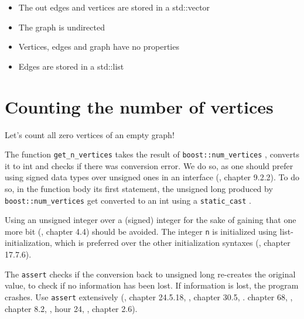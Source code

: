 \begin{itemize}
  \item The out edges and vertices are stored in a std::vector
  \item The graph is undirected
  \item Vertices, edges and graph have no properties
  \item Edges are stored in a std::list
\end{itemize}

\section{Counting the number of vertices}
\label{subsec:get_n_vertices}

Let's count all zero vertices of an empty graph!



The function \verb;get_n_vertices; takes the result of \verb;boost::num_vertices;
, converts it to int and checks if there was conversion error.
We do so, as one should prefer using signed data types over unsigned ones
in an interface (\cite{lakos1996large}, chapter 9.2.2).
To do so, in the function body its first statement, 
the unsigned long 
produced by \verb;boost::num_vertices; 
get converted to an int using a \verb;static_cast; .

Using an unsigned integer over a (signed) integer for the sake of gaining
that one more bit (\cite{stroustrup1997}, chapter 4.4) should be avoided.
The integer \verb;n; is initialized using list-initialization, which is preferred
over the other initialization syntaxes (\cite{stroustrup2013}, chapter 17.7.6).

The \verb;assert; checks if the conversion back to unsigned long re-creates the
original value, to check if no information has been lost.
If information is lost, the program crashes.
Use \verb;assert;  extensively 
(\cite{stroustrup1997}, chapter 24.5.18, 
\cite{stroustrup2013}, chapter 30.5, 
\cite{sutter_and_alexandrescu2004}. chapter 68, 
\cite{mcconnell2004code}, chapter 8.2, 
\cite{liberty2001sams}, hour 24, 
\cite{lakos1996large}, chapter 2.6).

